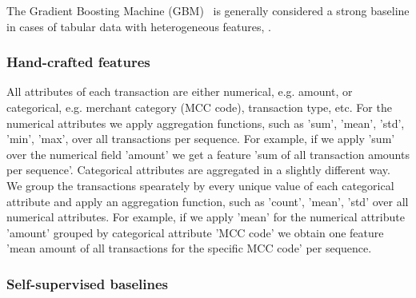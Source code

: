 \documentclass[sigconf, anonymous]{acmart}
\begin{document}
The Gradient Boosting Machine (GBM)~\citep{Friedman2001GreedyFA} is generally considered a strong
baseline in cases of tabular data with heterogeneous features,%
\citep{Wu2009AdaptingBF,Vorobev2019LearningTS,Zhang2015AGB,Niu2019ACS}.
%

\subsubsection{Hand-crafted features} \label{sec-hand-features}
All attributes of each transaction are either numerical, e.g. amount, or categorical, e.g.
merchant category (MCC code), transaction type, etc.
% 
For the numerical attributes we apply aggregation functions, such as 'sum', 'mean', 'std',
'min', 'max', over all transactions per sequence. For example, if we apply 'sum' over the
numerical field 'amount' we get a feature 'sum of all transaction amounts per sequence'.
%
Categorical attributes are aggregated in a slightly different way. We group the transactions
spearately by every unique value of each categorical attribute and apply an aggregation
function, such as 'count', 'mean', 'std' over all numerical attributes. For example, if
we apply 'mean' for the numerical attribute 'amount' grouped by categorical attribute
'MCC code' we obtain one feature 'mean amount of all transactions for the specific MCC
code' per sequence.

\subsubsection{Self-supervised baselines} \label{sec-ss-base}
\end{document}
